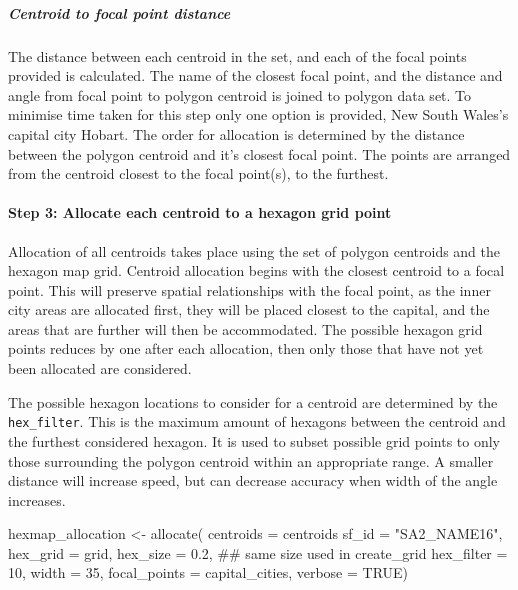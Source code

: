 \hypertarget{centroid-to-focal-point-distance}{%
\subparagraph{Centroid to focal point
distance}\label{centroid-to-focal-point-distance}}

The distance between each centroid in the set, and each of the focal
points provided is calculated. The name of the closest focal point, and
the distance and angle from focal point to polygon centroid is joined to
polygon data set. To minimise time taken for this step only one option
is provided, New South Wales's capital city Hobart. The order for
allocation is determined by the distance between the polygon centroid
and it's closest focal point. The points are arranged from the centroid
closest to the focal point(s), to the furthest.

\hypertarget{step-3-allocate-each-centroid-to-a-hexagon-grid-point}{%
\paragraph{Step 3: Allocate each centroid to a hexagon grid
point}\label{step-3-allocate-each-centroid-to-a-hexagon-grid-point}}

Allocation of all centroids takes place using the set of polygon
centroids and the hexagon map grid. Centroid allocation begins with the
closest centroid to a focal point. This will preserve spatial
relationships with the focal point, as the inner city areas are
allocated first, they will be placed closest to the capital, and the
areas that are further will then be accommodated. The possible hexagon
grid points reduces by one after each allocation, then only those that
have not yet been allocated are considered.

The possible hexagon locations to consider for a centroid are determined
by the \texttt{hex\_filter}. This is the maximum amount of hexagons
between the centroid and the furthest considered hexagon. It is used to
subset possible grid points to only those surrounding the polygon
centroid within an appropriate range. A smaller distance will increase
speed, but can decrease accuracy when width of the angle increases.

\begin{Schunk}
\begin{Sinput}
hexmap_allocation <- allocate(
  centroids = centroids %
  sf_id = "SA2_NAME16",
  hex_grid = grid,
  hex_size = 0.2, ## same size used in create_grid
  hex_filter = 10,
  width = 35,
  focal_points = capital_cities,
  verbose = TRUE)
\end{Sinput}
\end{Schunk}

